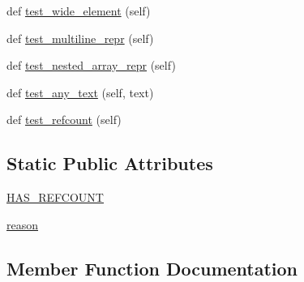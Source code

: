 \begin{DoxyCompactItemize}
\item 
def \hyperlink{classnumpy_1_1core_1_1tests_1_1test__arrayprint_1_1TestArray2String_aa1ac79a7a4ce70061c2f687765c6d097}{test\+\_\+wide\+\_\+element} (self)
\item 
def \hyperlink{classnumpy_1_1core_1_1tests_1_1test__arrayprint_1_1TestArray2String_af82ca5e1e3b8c0946ecbbc8184b70c3d}{test\+\_\+multiline\+\_\+repr} (self)
\item 
def \hyperlink{classnumpy_1_1core_1_1tests_1_1test__arrayprint_1_1TestArray2String_a456a5be8c674fe1734d9ad74e07499c3}{test\+\_\+nested\+\_\+array\+\_\+repr} (self)
\item 
def \hyperlink{classnumpy_1_1core_1_1tests_1_1test__arrayprint_1_1TestArray2String_a6fc88e500bc0f940b009ff2b9c118b12}{test\+\_\+any\+\_\+text} (self, text)
\item 
def \hyperlink{classnumpy_1_1core_1_1tests_1_1test__arrayprint_1_1TestArray2String_a48587a893e9040ef588ccb490a848a6b}{test\+\_\+refcount} (self)
\end{DoxyCompactItemize}
\subsection*{Static Public Attributes}
\begin{DoxyCompactItemize}
\item 
\hyperlink{classnumpy_1_1core_1_1tests_1_1test__arrayprint_1_1TestArray2String_a2b670b50293079566478e578436d26ba}{H\+A\+S\+\_\+\+R\+E\+F\+C\+O\+U\+NT}
\item 
\hyperlink{classnumpy_1_1core_1_1tests_1_1test__arrayprint_1_1TestArray2String_a8784d98806c80b5316aa05ffa0227d42}{reason}
\end{DoxyCompactItemize}


\subsection{Member Function Documentation}
\mbox{\label{classnumpy_1_1core_1_1tests_1_1test__arrayprint_1_1TestArray2String_a6fc88e500bc0f940b009ff2b9c118b12}} 
